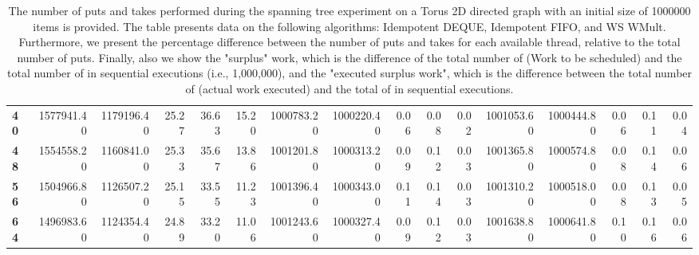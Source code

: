 \begin{table}[!ht]
{\begin{tabular}{lrrrrrrrrrrrrrrr}
\textbf{40} &       1577941.40 & 1179196.40 &          25.27 &       36.63 &                15.20 &      1000783.20 & 1000220.40 &           0.06 &        0.08 &                 0.02 & 1001053.60 & 1000444.80 &           0.06 &        0.11 &                 0.04 \\
\textbf{48} &       1554558.20 & 1160841.00 &          25.33 &       35.67 &                13.86 &      1001201.80 & 1000313.20 &           0.09 &        0.12 &                 0.03 & 1001365.80 & 1000574.80 &           0.08 &        0.14 &                 0.06 \\
\textbf{56} &       1504966.80 & 1126507.20 &          25.15 &       33.55 &                11.23 &      1001396.40 & 1000343.00 &           0.11 &        0.14 &                 0.03 & 1001310.20 & 1000518.00 &           0.08 &        0.13 &                 0.05 \\
\textbf{64} &       1496983.60 & 1124354.40 &          24.89 &       33.20 &                11.06 &      1001243.60 & 1000327.40 &           0.09 &        0.12 &                 0.03 & 1001638.80 & 1000641.80 &           0.10 &        0.16 &                 0.06 \\
\bottomrule
\end{tabular}}
\label{difference-Torus_2D_directed-1000000-IDEMPOTENT_DEQUE-IDEMPOTENT_FIFO-WS_NC_MULT_OPT}
\caption{The number of puts and takes performed during the
    spanning tree experiment on a Torus 2D directed graph with an initial size
    of 1000000 items is provided. The table presents data on the
    following algorithms: Idempotent DEQUE, Idempotent FIFO, and
    WS WMult. Furthermore, we present the percentage difference
    between the number of puts and takes for each available thread,
    relative to the total number of puts. Finally, also we show the
    "surplus" work, which is the difference of the total number of
    \Puts (Work to be scheduled) and the total number of \Puts in
    sequential executions (i.e., 1,000,000), and the "executed surplus
    work", which is the difference between the total number of \Takes
    (actual work executed) and the total of \Takes in sequential
    executions.}
\end{table}
